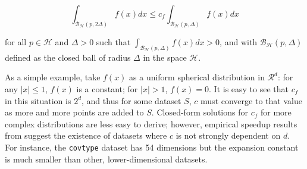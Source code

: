 \begin{equation}
\int_{\mathcal{B}_{\mathcal{H}}(p, 2 \Delta)} f(x) dx \le c_{f}
\int_{\mathcal{B}_{\mathcal{H}}(p, \Delta)} f(x)
dx
\end{equation}

\noindent for all $p \in \mathcal{H}$ and $\Delta > 0$ such that
$\int_{\mathcal{B}_{\mathcal{H}}(p, \Delta)} f(x) dx > 0$, and with
$\mathcal{B}_{\mathcal{H}}(p, \Delta)$ defined as the closed ball of radius
$\Delta$ in the space $\mathcal{H}$.

As a simple example, take $f(x)$ as a uniform spherical distribution in
$\mathcal{R}^d$: for any $|x| \le 1$, $f(x)$ is a constant; for $|x| > 1$, $f(x)
= 0$.  It is easy to see that $c_f$ in this situation is $2^d$, and thus for
some dataset $S$, $c$ must converge to that value as more and more points are
added to $S$.  Closed-form solutions for $c_f$ for more complex distributions
are less easy to derive; however, empirical speedup results from
\citet{langford2006} suggest the existence of datasets where $c$ is not strongly
dependent on $d$.  For instance, the \texttt{covtype} dataset has 54 dimensions
but the expansion constant is much smaller than other, lower-dimensional
datasets.


